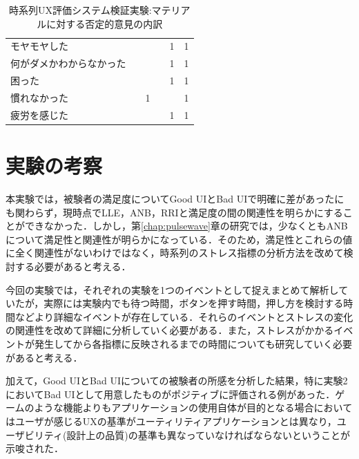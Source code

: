 \begin{table}[htbp]
\begin{tabular}{lrrrrr}
モヤモヤした       &                             &                            &                             & 1                          & 1                                       \\
何がダメかわからなかった &                             &                            &                             & 1                          & 1                                       \\
困った          &                             &                            &                             & 1                          & 1                                       \\
慣れなかった       &                             & 1                          &                             &                            & 1                                       \\
疲労を感じた       &                             &                            &                             & 1                          & 1                                      \\ \hline
\end{tabular}
\caption{時系列UX評価システム検証実験:マテリアルに対する否定的意見の内訳}
\label{table:nega}
\end{table}

\section{実験の考察}

本実験では，被験者の満足度についてGood UIとBad UIで明確に差があったにも関わらず，現時点でLLE，ANB，RRIと満足度の間の関連性を明らかにすることができなかった．しかし，第\ref{chap:pulsewave}章の研究では，少なくともANBについて満足性と関連性が明らかになっている．そのため，満足性とこれらの値に全く関連性がないわけではなく，時系列のストレス指標の分析方法を改めて検討する必要があると考える．

今回の実験では，それぞれの実験を1つのイベントとして捉えまとめて解析していたが，実際には実験内でも待つ時間，ボタンを押す時間，押し方を検討する時間などより詳細なイベントが存在している．それらのイベントとストレスの変化の関連性を改めて詳細に分析していく必要がある．また，ストレスがかかるイベントが発生してから各指標に反映されるまでの時間についても研究していく必要があると考える．

加えて，Good UIとBad UIについての被験者の所感を分析した結果，特に実験2においてBad UIとして用意したものがポジティブに評価される例があった．ゲームのような機能よりもアプリケーションの使用自体が目的となる場合においてはユーザが感じるUXの基準がユーティリティアプリケーションとは異なり，ユーザビリティ(設計上の品質)の基準も異なっていなければならないということが示唆された．



